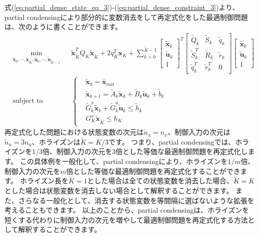 \documentclass[a4paper]{jarticle}
\begin{document}
式(\ref{eq:partial_dense_state_eq_3})-(\ref{eq:partial_dense_constraint_3})より、partial condensingにより部分的に変数消去をして再定式化をした最適制御問題は、次のように書くことができます。
\begin{equation}
\begin{aligned}
& \underset{ \tilde{\mathbf{x}}_{0},\cdots,\tilde{\mathbf{x}}_{\tilde{K}}, \tilde{\mathbf{u}}_{0},\cdots,\tilde{\mathbf{u}}_{\tilde{K}-1}}{\text{min}} && 
\tilde{\mathbf{x}}_{\tilde{K}}^TQ_{K}\tilde{\mathbf{x}}_{\tilde{K}}+
2q_K^T\mathbf{x}_{K}+
\sum_{k=0}^{\tilde{K}-1}
\begin{bmatrix} \tilde{\mathbf{x}}_k \\ \tilde{\mathbf{u}}_k \\ 1\end{bmatrix}^T
\begin{bmatrix} \tilde{Q}_k & \tilde{S}_k & \tilde{q}_k \\ \tilde{S}_k^T & \tilde{R}_k & \tilde{r}_k \\ \tilde{q}_k^T & \tilde{r}_k^T & 0\end{bmatrix}
\begin{bmatrix} \tilde{\mathbf{x}}_k \\ \tilde{\mathbf{u}}_k \\ 1\end{bmatrix} \\
&\text{subject to} && \left \{
\begin{aligned}
    & \tilde{\mathbf{x}}_0 = \bar{\mathbf{x}}_{init}\\
    & \tilde{\mathbf{x}}_{k+1} = \tilde{A}_k \tilde{\mathbf{x}}_k + \tilde{B}_k \tilde{\mathbf{u}}_k + \tilde{b}_k\\
    & \tilde{G}^{x}_k \tilde{\mathbf{x}}_k + \tilde{G}^{u}_k\tilde{\mathbf{u}}_k \le \tilde{h}_k\\
    & G^{x}_K\tilde{\mathbf{x}}_{\tilde{K}}\le h_K
\end{aligned}
\right .
\end{aligned}
\label{eq:ocp_qp_partial_cond}
\end{equation}
再定式化した問題における状態変数の次元は$\tilde{n}_x=n_x$、制御入力の次元は$\tilde{n}_u=3n_u$、ホライズンは$\tilde{K}=K/3$です。
つまり、partial condensingでは、ホライズンを$1/3$倍、制御入力の次元を3倍とした等価な最適制御問題を再定式化します。
この具体例を一般化して、partial condensingにより、ホライズンを$1/m$倍、制御入力の次元を$m$倍とした等価な最適制御問題を再定式化することができます\cite{axehill2015controlling,frison2015algorithms}。
ホライズン長を$\tilde{K}=1$とした場合は全ての状態変数を消去した場合、$\tilde{K}=K$とした場合は状態変数を消去しない場合として解釈することができます。
また、さらなる一般化として、消去する状態変数を等間隔に選ばないような拡張を考えることもできます。
以上のことから、partial condensingは、ホライズンを短くする代わりに制御入力の次元を増やして最適制御問題を再定式化する方法として解釈することができます。
\end{document}

